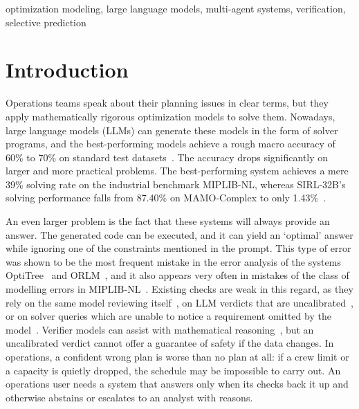 \documentclass[conference]{IEEEtran}
\begin{document}
\begin{IEEEkeywords}
optimization modeling, large language models, multi-agent systems, verification, selective prediction
\end{IEEEkeywords}

\section{Introduction}
\label{sec:intro}

Operations teams speak about their planning issues in clear terms, but they apply mathematically rigorous optimization
models to solve them. Nowadays, large language models (LLMs) can generate these models in the form of solver programs, and the
best-performing models achieve a rough macro accuracy of 60\% to 70\% on standard test
datasets~\cite{chen2025sirl,lu2025optmath,huang2025orlm}. The accuracy drops significantly on larger and more
practical problems. The best-performing system achieves a mere 39\% solving rate on the industrial benchmark
MIPLIB-NL, whereas SIRL-32B's solving performance falls from 87.40\% on MAMO-Complex to only
1.43\%~\cite{li2026miplibnl,shen2024mamo}.

An even larger problem is the fact that these systems will always provide an answer. The generated code can be
executed, and it can yield an `optimal' answer while ignoring one of the constraints mentioned in the prompt. This type
of error was shown to be the most frequent mistake in the error analysis of the systems OptiTree~\cite{liu2025optitree}
and ORLM~\cite{huang2025orlm}, and it also appears very often in mistakes of the class of modelling errors in
MIPLIB-NL~\cite{li2026miplibnl}. Existing checks are weak in this regard, as they rely on the same model
reviewing itself~\cite{jiang2025llmopt}, on LLM verdicts that are uncalibrated~\cite{liu2026optverifier,zheng2023judging},
or on solver queries which are unable to notice a requirement omitted by the model~\cite{abdulrahman2026verisimpl}.
Verifier models can assist with mathematical reasoning~\cite{cobbe2021gsm8k}, but an uncalibrated verdict cannot offer
a guarantee of safety if the data changes. In operations, a confident wrong plan is worse than no plan at all: if a crew limit or a capacity is quietly
dropped, the schedule may be impossible to carry out. An operations user needs a system that answers only when its
checks back it up and otherwise abstains or escalates to an analyst with reasons.
\end{document}
